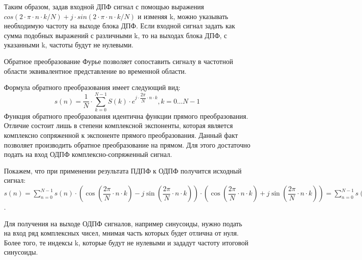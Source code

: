 Таким образом, задав входной ДПФ сигнал с помощью выражения \(cos(2 \cdot \pi \cdot n \cdot k / N) + j \cdot sin(2 \cdot \pi \cdot n \cdot k / N) \) и изменяя k, можно указывать необходимую частоту на
выходе блока ДПФ. Если входной сигнал задать как сумма подобных выражений с различными k, то на выходах
блока ДПФ, с указанными k, частоты будут не нулевыми.

Обратное преобразование Фурье позволяет сопоставить сигналу в частотной области эквивалентное представление во временной области.

Формула обратного преобразования имеет следующий вид:
\begin{equation}
s(n) = \dfrac{1}{N}\cdot \sum_{k=0}^{N-1} S(k) \cdot e^{j \cdot \dfrac{2\pi}{N} \cdot n \cdot k}, k = 0 \dots N-1
\end{equation}
Функция обратного преобразования идентична функции прямого преобразования. Отличие состоит лишь в
степени комплексной экспоненты, которая является комплексно сопряженной к экспоненте прямого
преобразования. Данный факт позволяет производить обратное преобразование на прямом. Для этого
достаточно подать на вход ОДПФ комплексно-сопряженный сигнал.

Покажем, что при применении результата ПДПФ к ОДПФ получится исходный сигнал:\newline
\(s(n) = \sum_{n = 0}^{N -1} s(n) \cdot (\cos(\dfrac{2\pi}{N} \cdot n \cdot k) - j \sin(\dfrac{2\pi}{N}
\cdot n \cdot k)) \cdot (\cos(\dfrac{2\pi}{N} \cdot n \cdot k) + j \sin(\dfrac{2\pi}{N} \cdot n \cdot
k)) = \sum_{n = 0}^{N -1} s(n) \cdot \cos^2(\dfrac{2\pi}{N} \cdot n \cdot k) - j^2 \cdot
\sin^2(\dfrac{2\pi}{N} \cdot n \cdot k)) = \sum_{n = 0}^{N -1} s(n) \cdot 1\).

Для получения на выходе ОДПФ сигналов, например синусоиды, нужно подать на вход ряд
комплексных чисел, мнимая часть которых будет отлична от нуля. Более того, те индексы k, которые будут
не нулевыми и зададут частоту итоговой синусоиды.

\lstset{language=Matlab,
        basicstyle=\small}


\newpage